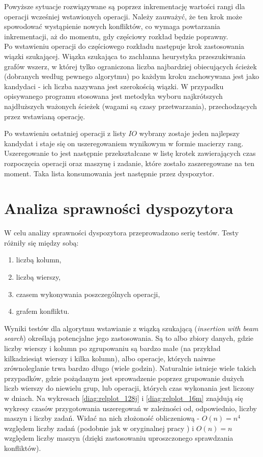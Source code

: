 \documentclass[brudnopis]{xmgr}
\begin{document}
 Powyższe sytuacje rozwiązywane są poprzez inkrementację wartości rangi dla operacji wcześniej wstawionych operacji. Należy zauważyć, że ten krok może spowodować wystąpienie nowych konfliktów, co wymaga powtarzania inkrementacji, aż do momentu, gdy częściowy rozkład będzie poprawny.\\
 
 Po wstawieniu operacji do częściowego rozkładu następuje krok zastosowania wiązki szukającej.
 Wiązka szukająca to zachłanna heurystyka przeszukiwania grafów wszerz, w której tylko ograniczona liczba najbardziej obiecujących ścieżek (dobranych według pewnego algorytmu) po każdym kroku zachowywana jest jako kandydaci - ich liczba nazywana jest szerokością wiązki.
 W przypadku opisywanego programu stosowana jest metodyka wyboru najkrótszych najdłuższych ważonych ścieżek (wagami są czasy przetwarzania), przechodzących przez wstawianą operację.
 
 Po wstawieniu ostatniej operacji z listy $IO$ wybrany zostaje jeden najlepszy kandydat i staje się on uszeregowaniem wynikowym w formie macierzy rang.
 Uszeregowanie to jest następnie przekształcane w listę krotek zawierających czas rozpoczęcia operacji oraz maszynę i zadanie, które zostało zaszeregowane na ten moment. Taka lista konsumowania jest następnie przez dyspozytor.



\chapter{Analiza sprawności dyspozytora}

W celu analizy sprawności dyspozytora przeprowadzono serię testów.
Testy różniły się między sobą:
\begin{enumerate}
    \item liczbą kolumn,
    \item liczbą wierszy,
    \item czasem wykonywania poszczególnych operacji,
    \item grafem konfliktu.
\end{enumerate}

Wyniki testów dla algorytmu wstawianie z wiązką szukającą (\emph{insertion with beam search}) określają potencjalne jego zastosowania. Są to albo zbiory danych, gdzie liczby wierszy i kolumn po zgrupowaniu są bardzo małe (na przykład kilkadziesiąt wierszy i kilka kolumn), albo operacje, których naiwne zrównoleglanie trwa bardzo długo (wiele godzin). Naturalnie istnieje wiele takich przypadków, gdzie pożądanym jest sprowadzenie poprzez grupowanie dużych liczb wierszy do niewielu grup, lub operacji, których czas wykonania jest liczony w dniach. Na wykresach \ref{diag:relplot_128j} i \ref{diag:relplot_16m} znajdują się wykresy czasów przygotowania uszeregowań w zależności od, odpowiednio, liczby maszyn i liczby zadań. Widać na nich złożoność obliczeniową - $O(n)=n^4$ względem liczby zadań (podobnie jak w oryginalnej pracy \cite{brasel1993constructive}) i $O(n)=n$ względem liczby maszyn (dzięki zastosowaniu uproszczonego sprawdzania konfliktów).
\end{document}
